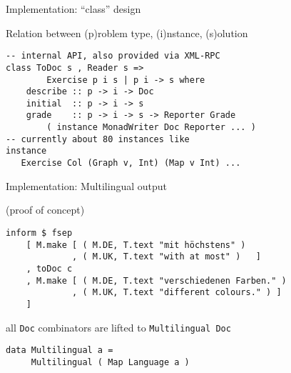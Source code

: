 \begin{slide}{Implementation: ``class'' design}

Relation between (p)roblem type, (i)nstance, (s)olution
\begin{verbatim}
-- internal API, also provided via XML-RPC
class ToDoc s , Reader s =>
        Exercise p i s | p i -> s where
    describe :: p -> i -> Doc
    initial  :: p -> i -> s
    grade    :: p -> i -> s -> Reporter Grade
        ( instance MonadWriter Doc Reporter ... )
-- currently about 80 instances like
instance 
   Exercise Col (Graph v, Int) (Map v Int) ...
\end{verbatim}
  
\end{slide}

\begin{slide}{Implementation: Multilingual output}

(proof of concept)
\begin{small}
\begin{verbatim}
inform $ fsep
    [ M.make [ ( M.DE, T.text "mit höchstens" )
             , ( M.UK, T.text "with at most" )   ]
    , toDoc c
    , M.make [ ( M.DE, T.text "verschiedenen Farben." )
             , ( M.UK, T.text "different colours." ) ]
    ]
\end{verbatim}
\end{small}  
all \verb|Doc| combinators are lifted to \verb|Multilingual Doc|
\begin{verbatim}
data Multilingual a = 
     Multilingual ( Map Language a )
\end{verbatim}

\end{slide}

